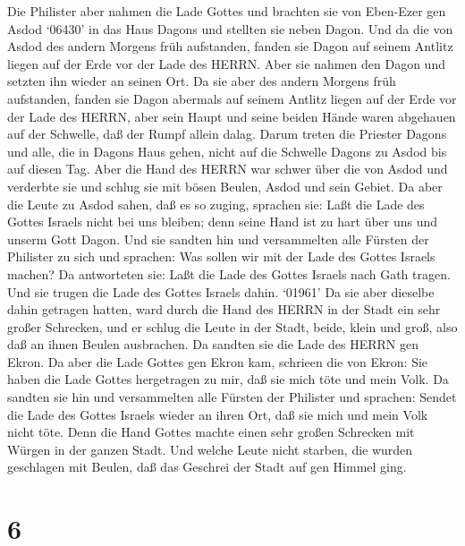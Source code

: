  Die Philister aber nahmen die Lade Gottes und brachten sie
von Eben-Ezer gen Asdod  `06430' in das Haus Dagons und
stellten sie neben Dagon.  Und da die von Asdod des andern
Morgens früh aufstanden, fanden sie Dagon auf seinem Antlitz liegen auf
der Erde vor der Lade des HERRN. Aber sie nahmen den Dagon und setzten
ihn wieder an seinen Ort.  Da sie aber des andern Morgens
früh aufstanden, fanden sie Dagon abermals auf seinem Antlitz liegen auf
der Erde vor der Lade des HERRN, aber sein Haupt und seine beiden Hände
waren abgehauen auf der Schwelle, daß der Rumpf allein dalag.
 Darum treten die Priester Dagons und alle, die in Dagons
Haus gehen, nicht auf die Schwelle Dagons zu Asdod bis auf diesen Tag.
 Aber die Hand des HERRN war schwer über die von Asdod und
verderbte sie und schlug sie mit bösen Beulen, Asdod und sein Gebiet.
 Da aber die Leute zu Asdod sahen, daß es so zuging,
sprachen sie: Laßt die Lade des Gottes Israels nicht bei uns bleiben;
denn seine Hand ist zu hart über uns und unserm Gott Dagon. 
Und sie sandten hin und versammelten alle Fürsten der Philister zu sich
und sprachen: Was sollen wir mit der Lade des Gottes Israels machen? Da
antworteten sie: Laßt die Lade des Gottes Israels nach Gath tragen. Und
sie trugen die Lade des Gottes Israels dahin.  `01961' Da
sie aber dieselbe dahin getragen hatten, ward durch die Hand des HERRN
in der Stadt ein sehr großer Schrecken, und er schlug die Leute in der
Stadt, beide, klein und groß, also daß an ihnen Beulen ausbrachen.
 Da sandten sie die Lade des HERRN gen Ekron. Da aber die
Lade Gottes gen Ekron kam, schrieen die von Ekron: Sie haben die Lade
Gottes hergetragen zu mir, daß sie mich töte und mein Volk.
 Da sandten sie hin und versammelten alle Fürsten der
Philister und sprachen: Sendet die Lade des Gottes Israels wieder an
ihren Ort, daß sie mich und mein Volk nicht töte. Denn die Hand Gottes
machte einen sehr großen Schrecken mit Würgen in der ganzen Stadt.
 Und welche Leute nicht starben, die wurden geschlagen mit
Beulen, daß das Geschrei der Stadt auf gen Himmel ging.

\hypertarget{section-5}{%
\section{6}\label{section-5}}

